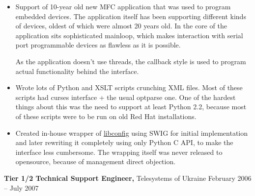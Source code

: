 \documentclass[margin]{res}
\begin{document}
\begin{resume}
\begin{itemize} \itemsep -1pt
\item Support of 10-year old new MFC application
  that was used to program embedded devices. The application itself
  has been supporting different kinds of devices, oldest of which
  were almost 20 years old. In the core of the application sits
  sophisticated mainloop, which makes interaction with serial port
  programmable devices as flawless as it is possible.




















  As the application doesn't use threads, the callback style is
  used to program actual functionality behind the interface.
\item Wrote lots of Python and XSLT scripts
  crunching XML files. Most of these scripts had curses interface +
  the usual optparse one. One of the hardest things about this was
  the need to support at least Python 2.2, because most of these scripts
  were to be run on old Red Hat installations.
\item Created in-house wrapper of
  \href{http://www.hyperrealm.com/libconfig/}{libconfig} using SWIG for initial
  implementation and later rewriting it completely using only Python C API, to make
  the interface less cumbersome. The wrapping itself was never released to
  opensource, because of management direct objection.
\end{itemize}



{\bf Tier 1/2 Technical Support Engineer,} Telesystems of Ukraine \hfill February 2006 -- July 2007





\end{resume}
\end{document}

